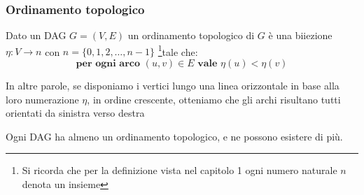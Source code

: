 \subsubsection{Ordinamento topologico}
\begin{definition}
    Dato un DAG $G = (V,E)$ un ordinamento topologico di $G$ è una biiezione $\eta: V \to n$ con $n = \{0,1,2,\ldots, n-1\}$ \footnote{Si ricorda che per la definizione vista nel capitolo 1 ogni numero naturale $n$ denota un insieme}tale che:
    \begin{equation}
        \textbf{per ogni arco } (u,v) \in E \textbf{ vale } \eta(u) < \eta(v)
    \end{equation}
\end{definition}
\hspace{-15pt}In altre parole, se disponiamo i vertici lungo una linea orizzontale in base alla loro numerazione $\eta$, in ordine crescente, otteniamo che gli archi risultano tutti orientati da sinistra verso destra
\begin{proposition}
    Ogni DAG ha almeno un ordinamento topologico, e ne possono esistere di più.
\end{proposition}

